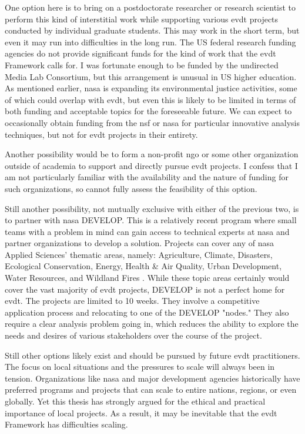 One option here is to bring on a postdoctorate researcher or research scientist to perform this kind of interstitial work while supporting various \ac{evdt} projects conducted by individual graduate students. This may work in the short term, but even it may run into difficulties in the long run. The US federal research funding agencies do not provide significant funds for the kind of work that the \ac{evdt} Framework calls for. I was fortunate enough to be funded by the undirected Media Lab Consortium, but this arrangement is unusual in US higher education. As mentioned earlier, \ac{nasa} is expanding its environmental justice activities, some of which could overlap with \ac{evdt}, but even this is likely to be limited in terms of both funding and acceptable topics for the foreseeable future. We can expect to occasionally obtain funding from the \ac{nsf} or \ac{nasa} for particular innovative analysis techniques, but not for \ac{evdt} projects in their entirety. 

Another possibility would be to form a non-profit \ac{ngo} or some other organization outside of academia to support and directly pursue \ac{evdt} projects. I confess that I am not particularly familiar with the availability and the nature of funding for such organizations, so cannot fully assess the feasibility of this option. 

Still another possibility, not mutually exclusive with either of the previous two, is to partner with \ac{nasa} DEVELOP. This is a relatively recent program where small teams with a problem in mind can gain access to technical experts at \ac{nasa} and partner organizations to develop a solution. Projects can cover any of \ac{nasa} Applied Sciences' thematic areas, namely: Agriculture, Climate, Disasters, Ecological Conservation, Energy, Health \& Air Quality, Urban Development, Water Resources, and Wildland Fires \cite{nasaappliedsciencesDEVELOP}. While these topic areas certainly would cover the vast majority of \ac{evdt} projects, DEVELOP is not a perfect home for \ac{evdt}. The projects are limited to 10 weeks. They involve a competitive application process and relocating to one of the DEVELOP "nodes." They also require a clear analysis problem going in, which reduces the ability to explore the needs and desires of various stakeholders over the course of the project.

Still other options likely exist and should be pursued by future \ac{evdt} practitioners. The focus on local situations and the pressures to scale will always been in tension. Organizations like \ac{nasa} and major development agencies historically have preferred programs and projects that can scale to entire nations, regions, or even globally. Yet this thesis has strongly argued for the ethical and practical importance of local projects. As a result, it may be inevitable that the \ac{evdt} Framework has difficulties scaling.	

